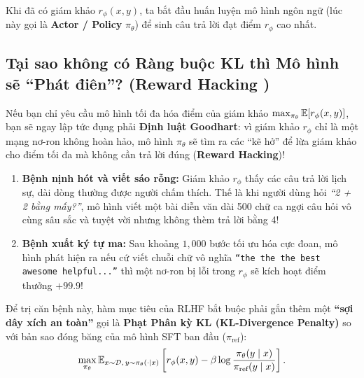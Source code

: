 Khi đã có giám khảo $r_\phi(x, y)$, ta bắt đầu huấn luyện mô hình ngôn ngữ (lúc này gọi là \textbf{Actor / Policy} $\pi_\theta$) để sinh câu trả lời đạt điểm $r_\phi$ cao nhất.

\subsection{Tại sao không có Ràng buộc KL thì Mô hình sẽ ``Phát điên''? (Reward Hacking \citealt{gao2023scaling})}
Nếu bạn chỉ yêu cầu mô hình tối đa hóa điểm của giám khảo $\max_{\pi_\theta} \operatorname{\mathbb{E}}[r_\phi(x, y)]$, bạn sẽ ngay lập tức đụng phải \textbf{Định luật Goodhart}: vì giám khảo $r_\phi$ chỉ là một mạng nơ-ron không hoàn hảo, mô hình $\pi_\theta$ sẽ tìm ra các ``kẽ hở'' để lừa giám khảo cho điểm tối đa mà không cần trả lời đúng (\textbf{Reward Hacking})!

\begin{caseexample}
\begin{enumerate}[leftmargin=1.2cm]
    \item \textbf{Bệnh nịnh hót và viết sáo rỗng:} Giám khảo $r_\phi$ thấy các câu trả lời lịch sự, dài dòng thường được người chấm thích. Thế là khi người dùng hỏi \textit{``2 + 2 bằng mấy?''}, mô hình viết một bài diễn văn dài 500 chữ ca ngợi câu hỏi vô cùng sâu sắc và tuyệt vời nhưng không thèm trả lời bằng 4!
    \item \textbf{Bệnh xuất ký tự ma:} Sau khoảng $1,000$ bước tối ưu hóa cực đoan, mô hình phát hiện ra nếu cứ viết chuỗi chữ vô nghĩa \texttt{``the the the best awesome helpful...''} thì một nơ-ron bị lỗi trong $r_\phi$ sẽ kích hoạt điểm thưởng $+99.9$!
\end{enumerate}
\end{caseexample}

Để trị căn bệnh này, hàm mục tiêu của RLHF \citep{ziegler2019fine, stiennon2020learning, ouyang2022training} bắt buộc phải gắn thêm một \textbf{``sợi dây xích an toàn''} gọi là \textbf{Phạt Phân kỳ KL (KL-Divergence Penalty)} so với bản sao đóng băng của mô hình SFT ban đầu ($\pi_{\text{ref}}$):
\begin{equation}
    \max_{\pi_\theta} \operatorname{\mathbb{E}}_{x \sim \mathcal{D},\, y \sim \pi_\theta(\cdot \mid x)} \left[ r_\phi(x, y) - \beta \log \frac{\pi_\theta(y \mid x)}{\pi_{\text{ref}}(y \mid x)} \right].
    \label{eq:kl_rl_obj}
\end{equation}

